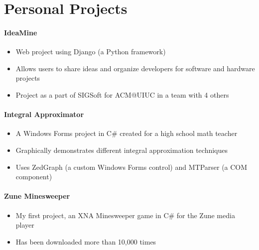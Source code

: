 \documentclass[letterpaper,12pt]{article}
\begin{document}
\section*{Personal Projects}
\paragraph{IdeaMine}
\begin{itemize}
\item Web project using Django (a Python framework)
\item Allows users to share ideas and organize developers
for software and hardware projects
\item Project as a part of SIGSoft for ACM@UIUC in a team with 4 others
\end{itemize}

\paragraph{Integral Approximator}
\begin{itemize}
\item A Windows Forms project in C\# created for a high school math teacher
\item Graphically demonstrates different integral approximation techniques
\item Uses ZedGraph (a custom Windows Forms control)
and MTParser (a COM component)
\end{itemize}

\paragraph{Zune Minesweeper}
\begin{itemize}
\item My first project, an XNA Minesweeper game in C\#
for the Zune media player
\item Has been downloaded more than 10,000 times
\end{itemize}
\end{document}
